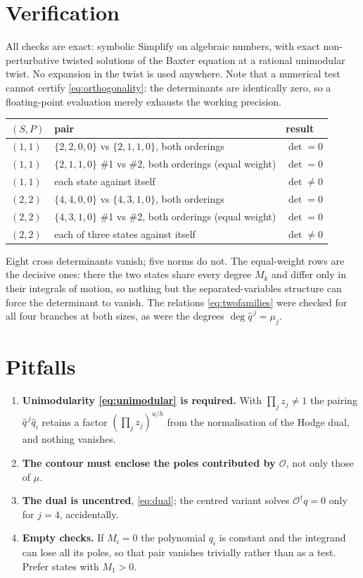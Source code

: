 \documentclass[11pt]{article}
\newcommand{\Op}{\mathcal{O}}
\newcommand{\qh}{\hat q}
\begin{document}
\section{Verification}

All checks are exact: symbolic $\mathrm{Simplify}$ on algebraic numbers, with exact
non-perturbative twisted solutions of the Baxter equation at a rational unimodular twist. No
expansion in the twist is used anywhere. Note that a numerical test cannot certify
\eqref{eq:orthogonality}: the determinants are identically zero, so a floating-point evaluation
merely exhausts the working precision.

\begin{center}
\begin{tabular}{lll}
\hline
$(S,P)$ & pair & result \\
\hline
$(1,1)$ & $\{2,2,0,0\}$ vs $\{2,1,1,0\}$, both orderings & $\det = 0$ \\
$(1,1)$ & $\{2,1,1,0\}$ \#1 vs \#2, both orderings (equal weight) & $\det = 0$ \\
$(1,1)$ & each state against itself & $\det \neq 0$ \\
$(2,2)$ & $\{4,4,0,0\}$ vs $\{4,3,1,0\}$, both orderings & $\det = 0$ \\
$(2,2)$ & $\{4,3,1,0\}$ \#1 vs \#2, both orderings (equal weight) & $\det = 0$ \\
$(2,2)$ & each of three states against itself & $\det \neq 0$ \\
\hline
\end{tabular}
\end{center}

Eight cross determinants vanish; five norms do not. The equal-weight rows are the decisive ones:
there the two states share every degree $M_k$ and differ only in their integrals of motion, so
nothing but the separated-variables structure can force the determinant to vanish. The relations
\eqref{eq:twofamilies} were checked for all four branches at both sizes, as were the degrees
$\deg \qh^{\,j} = \mu_j$.

\section{Pitfalls}

\begin{enumerate}
\item \textbf{Unimodularity \eqref{eq:unimodular} is required.} With $\prod_j z_j \neq 1$ the
pairing $\qh^{\,j}\qh_i$ retains a factor $(\prod_j z_j)^{u/h}$ from the normalisation of the Hodge
dual, and nothing vanishes.
\item \textbf{The contour must enclose the poles contributed by $\Op$}, not only those of $\mu$.
\item \textbf{The dual is uncentred}, \eqref{eq:dual}; the centred variant solves $\Op^\dagger q=0$
only for $j=4$, accidentally.
\item \textbf{Empty checks.} If $M_i = 0$ the polynomial $q_i$ is constant and the integrand can
lose all its poles, so that pair vanishes trivially rather than as a test. Prefer states with
$M_1 > 0$.
\end{enumerate}
\end{document}
